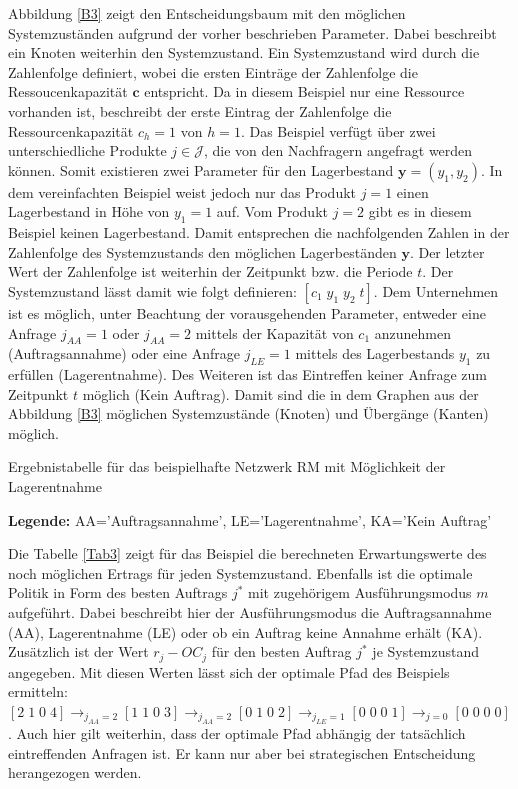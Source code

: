 Abbildung \ref{B3} zeigt den Entscheidungsbaum mit den möglichen Systemzuständen aufgrund der vorher beschrieben Parameter. Dabei beschreibt ein Knoten weiterhin den Systemzustand. Ein Systemzustand wird durch die Zahlenfolge definiert, wobei die ersten Einträge der Zahlenfolge die Ressoucenkapazität $\textbf{c}$ entspricht. Da in diesem Beispiel nur eine Ressource vorhanden ist, beschreibt der erste Eintrag der Zahlenfolge die Ressourcenkapazität $c_{h}=1$ von $h=1$. Das Beispiel verfügt über zwei unterschiedliche Produkte $j\in\mathcal{J}$, die von den Nachfragern angefragt werden können. Somit existieren zwei Parameter für den Lagerbestand $\textbf{y}=(y_{1},y_{2})$. In dem vereinfachten Beispiel weist jedoch nur das Produkt $j=1$ einen Lagerbestand in Höhe von $y_{1}=1$ auf. Vom Produkt $j=2$ gibt es in diesem Beispiel keinen Lagerbestand. Damit entsprechen die nachfolgenden Zahlen in der Zahlenfolge des Systemzustands den möglichen Lagerbeständen $\textbf{y}$. Der letzter Wert der Zahlenfolge ist weiterhin der Zeitpunkt bzw. die Periode $t$. Der Systemzustand lässt damit wie folgt definieren: $[c_{1}\; y_{1}\; y_{2}\;t]$. Dem Unternehmen ist es möglich, unter Beachtung der vorausgehenden Parameter, entweder eine Anfrage $j_{AA}=1$ oder $j_{AA}=2$ mittels der Kapazität von $c_{1}$ anzunehmen (Auftragsannahme) oder eine Anfrage $j_{LE}=1$ mittels des Lagerbestands $y_{1}$ zu erfüllen (Lagerentnahme). Des Weiteren ist das Eintreffen keiner Anfrage zum Zeitpunkt $t$ möglich (Kein Auftrag). Damit sind die in dem Graphen aus der Abbildung \ref{B3} möglichen Systemzustände (Knoten) und Übergänge (Kanten) möglich.

\begin{table}
\begin{footnotesize}
    \caption{Ergebnistabelle für das beispielhafte Netzwerk RM mit Möglichkeit der Lagerentnahme} \label{Tab3}
    \vspace*{3mm}
\begin{center}
      {\footnotesize \textbf{Legende:} AA='Auftragsannahme', LE='Lagerentnahme', KA='Kein Auftrag'} 
      \end{center}
\end{footnotesize}
\end{table}

Die Tabelle \ref{Tab3} zeigt für das Beispiel die berechneten Erwartungswerte des noch möglichen Ertrags für jeden Systemzustand. Ebenfalls ist die optimale Politik in Form des besten Auftrags $j^*$ mit zugehörigem Ausführungsmodus $m$ aufgeführt. Dabei beschreibt hier der Ausführungsmodus die Auftragsannahme (AA), Lagerentnahme (LE) oder ob ein Auftrag keine Annahme erhält (KA). Zusätzlich ist der Wert $r_{j}-OC_{j}$ für den besten Auftrag $j^*$ je Systemzustand angegeben. Mit diesen Werten lässt sich der optimale Pfad des Beispiels ermitteln: $[2\;1\;0\;4] \rightarrow_{j_{AA}=2} [1\;1\;0\;3] \rightarrow_{j_{AA}=2} [0\;1\;0\;2] \rightarrow_{j_{LE}=1} [0\;0\;0\;1]\rightarrow_{j=0} [0\;0\;0\;0]$. Auch hier gilt weiterhin, dass der optimale Pfad abhängig der tatsächlich eintreffenden Anfragen ist. Er kann nur aber bei strategischen Entscheidung herangezogen werden.

